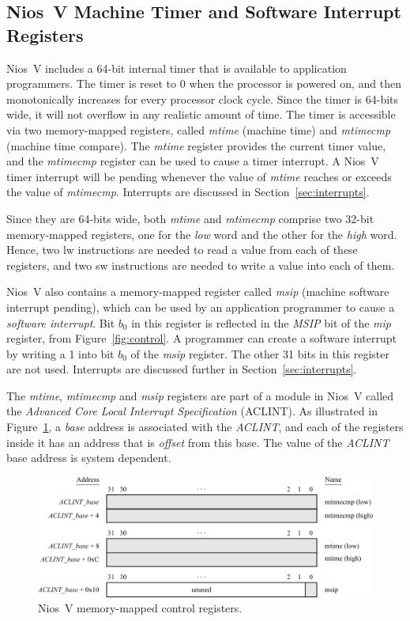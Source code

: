 \documentclass[11pt, twoside, pdftex]{article}
\begin{document}
\subsection{Nios~V Machine Timer and Software Interrupt Registers}
\label{sec:timer}
Nios~V includes a 64-bit internal timer that is available to application programmers. 
The timer is reset to 0 when the processor is powered on, and then monotonically
increases for every processor clock cycle. 
Since the timer is 64-bits wide, it will not overflow in any realistic amount
of time. The timer is accessible via two memory-mapped registers, called {\it mtime}
(machine time) and {\it mtimecmp} (machine time compare). The {\it mtime} register provides 
the current timer value, and the {\it mtimecmp} register can be used to cause a timer 
interrupt. A Nios~V timer interrupt will be pending whenever the value of {\it mtime} reaches or
exceeds the value of {\it mtimecmp}. Interrupts are discussed in Section~\ref{sec:interrupts}.

Since they are 64-bits wide, both {\it mtime} and {\it mtimecmp} comprise two 32-bit 
memory-mapped registers, one for the {\it low} word and the other for the {\it high} word. 
Hence, two {\sf lw} instructions are needed to read a value from each of these registers, and 
two {\sf sw} instructions are needed to write a value into each of them.

Nios~V also contains a memory-mapped register called {\it msip} (machine software interrupt
pending), which can be used by an application programmer to cause a 
{\it software interrupt}. Bit $b_0$ in this register is reflected in the {\it MSIP} bit of 
the {\it mip} register, from Figure~\ref{fig:control}. A programmer can create a software 
interrupt by writing a 1 into bit $b_0$ of the {\it msip} register. The other 31 bits 
in this register are not used. Interrupts are discussed further in Section~\ref{sec:interrupts}.

The {\it mtime}, {\it mtimecmp} and {\it msip} registers are part of a module in Nios~V called
the {\it Advanced Core Local Interrupt Specification} (ACLINT). As illustrated in 
Figure~\ref{fig:mm_control}, a {\it base} address is associated with the {\it ACLINT}, and 
each of the registers inside it has an address that is {\it offset} from this base. The value of
the {\it ACLINT} base address is system dependent. 

\begin{figure}[h]
   \begin{center}
      \includegraphics[scale=.9]{figures/mm_control_registers.pdf}
   \caption{Nios~V memory-mapped control registers.} 
	 \label{fig:mm_control}
	 \end{center}
\end{figure}
\end{document}
